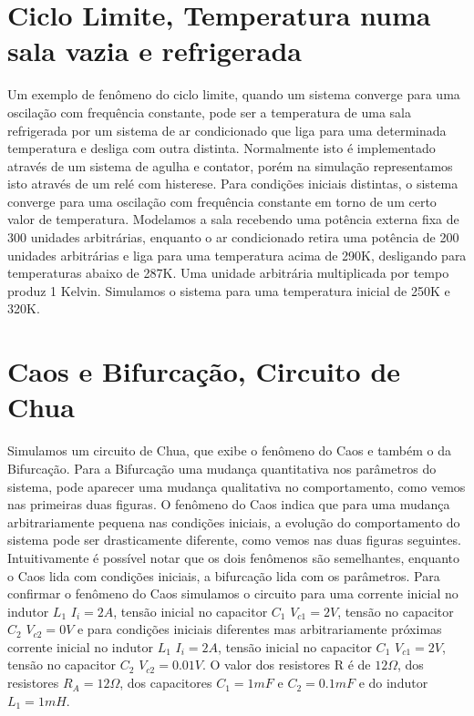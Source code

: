 \documentclass[11pt]{report}
\begin{document}
\section{Ciclo Limite, Temperatura numa sala vazia e refrigerada}
Um exemplo de fenômeno do ciclo limite, quando um sistema converge para uma oscilação com frequência constante, pode ser a temperatura de uma sala refrigerada por um sistema de ar condicionado que liga para uma determinada temperatura e desliga com outra distinta. Normalmente isto é implementado através de um sistema de agulha e contator, porém na simulação representamos isto através de um relé com histerese. Para condições iniciais distintas, o sistema converge para uma oscilação com frequência constante em torno de um certo valor de temperatura. Modelamos a sala recebendo uma potência externa fixa de 300 unidades arbitrárias, enquanto o ar condicionado retira uma potência de 200 unidades arbitrárias e liga para uma temperatura acima de 290K, desligando para temperaturas abaixo de 287K.  Uma unidade arbitrária multiplicada por tempo produz 1 Kelvin. Simulamos o sistema para uma temperatura inicial de 250K e 320K.

\section{Caos e Bifurcação, Circuito de Chua}

Simulamos um circuito de Chua, que exibe o fenômeno do Caos e também o da Bifurcação. Para a Bifurcação uma mudança quantitativa nos parâmetros do sistema, pode aparecer uma mudança qualitativa no comportamento, como vemos nas primeiras duas figuras. O fenômeno do Caos indica que para uma mudança arbitrariamente pequena nas condições iniciais, a evolução do comportamento do sistema pode ser drasticamente diferente, como vemos nas duas figuras seguintes. Intuitivamente é possível notar que os dois fenômenos são semelhantes, enquanto o Caos lida com condições iniciais, a bifurcação lida com os parâmetros. Para confirmar o fenômeno do Caos simulamos o circuito para uma corrente inicial no indutor $L_1$ $I_i=2A$, tensão inicial no capacitor $C_1$ $V_{c1}=2V$, tensão no capacitor $C_2$ $V_{c2}=0V$ e para condições iniciais diferentes mas arbitrariamente próximas corrente inicial no indutor $L_1$ $I_i=2A$, tensão inicial no capacitor $C_1$ $V_{c1}=2V$, tensão no capacitor $C_2$ $V_{c2}=0.01V$. O valor dos resistores R é de $12\Omega$, dos resistores $R_A=12\Omega$, dos capacitores $C_1=1mF$ e $C_2=0.1mF$ e do indutor $L_1=1mH$. 
\end{document}
